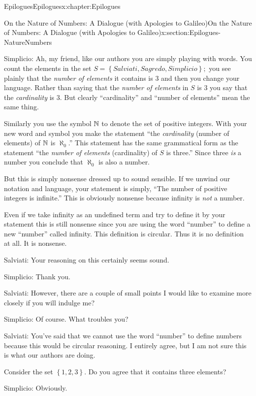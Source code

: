 \begin{chapterptx}{Epilogues}{}{Epilogues}{}{}{x:chapter:Epilogues}
\begin{sectionptx}{On the Nature of Numbers: A Dialogue (with Apologies to Galileo)}{}{On the Nature of Numbers: A Dialogue (with Apologies to Galileo)}{}{}{x:section:Epilogues-NatureNumbers}
\begin{introduction}{}
			\par
			\alert{Simplicio}: Ah, my friend, like our authors you are simply playing with words. You count the elements in the set \(S=\left\{Salviati, Sagredo, Simplicio\right\};\) you see plainly that the \emph{number of elements} it contains is \(3\) and then you change your language. Rather than saying that the \emph{number of elements} in \(S\) is \(3\) you say that the \emph{cardinality} is \(3\). But clearly ``cardinality'' and ``number of elements'' mean the same thing.%
			\par
			Similarly you use the symbol \(\mathbb {N}\) to denote the set of positive integers. With your new word and symbol you make the statement ``the \emph{cardinality} (number of elements) of \(\mathbb {N}\) is \(\aleph_0\).'' This statement has the same grammatical form as the statement ``the \emph{number of elements} (cardinality) of \(S\) is three.'' Since three \emph{is} a number you conclude that \(\aleph_0\) is also a number.%
			\par
			But this is simply nonsense dressed up to sound sensible. If we unwind our notation and language, your statement is simply, ``The number of positive integers is infinite.'' This is obviously nonsense because infinity is \emph{not} a number.%
			\par
			Even if we take infinity as an undefined term and try to define it by your statement this is still nonsense since you are using the word ``number'' to define a new ``number'' called infinity. This definition is circular. Thus it is no definition at all. It is nonsense.%
			\par
			\alert{Salviati}: Your reasoning on this certainly seems sound.%
			\par
			\alert{Simplicio}: Thank you.%
			\par
			\alert{Salviati}:  However, there are a couple of small points I would like to examine more closely if you will indulge me?%
			\par
			\alert{Simplicio}: Of course. What troubles you?%
			\par
			\alert{Salviati}: You've said that we cannot use the word ``number'' to define numbers because this would be circular reasoning. I entirely agree, but I am not sure this is what our authors are doing.%
			\par
			Consider the set \(\left\{1, 2, 3\right\}\). Do you agree that it contains three elements?%
			\par
			\alert{Simplicio}: Obviously.%
			\par

\end{introduction}
\end{sectionptx}
\end{chapterptx}
